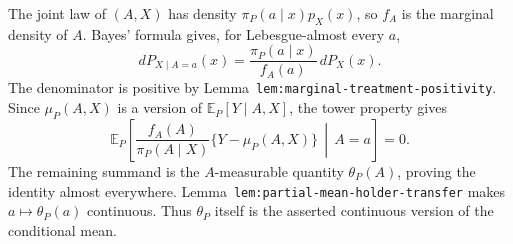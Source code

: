 The joint law of \((A,X)\) has density \(\pi_P(a\mid x)p_X(x)\), so \(f_A\) is the marginal density of \(A\). Bayes' formula gives, for Lebesgue-almost every \(a\),
\[
dP_{X\mid A=a}(x)=\frac{\pi_P(a\mid x)}{f_A(a)}\,dP_X(x).
\]
The denominator is positive by Lemma~\texttt{lem:marginal-treatment-positivity}. Since \(\mu_P(A,X)\) is a version of \(\mathbb E_P[Y\mid A,X]\), the tower property gives
\[
\mathbb E_P\!\left[\frac{f_A(A)}{\pi_P(A\mid X)}\{Y-\mu_P(A,X)\}\,\middle|\,A=a\right]
=0.
\]
The remaining summand is the \(A\)-measurable quantity \(\theta_P(A)\), proving the identity almost everywhere. Lemma~\texttt{lem:partial-mean-holder-transfer} makes \(a\mapsto\theta_P(a)\) continuous. Thus \(\theta_P\) itself is the asserted continuous version of the conditional mean.